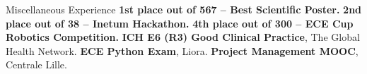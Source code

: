 \begin{rubric}{Miscellaneous Experience}
\entry*[2024] \textbf{1st place out of 567 -- Best Scientific Poster.}
\entry*[2024] \textbf{2nd place out of 38 -- Inetum Hackathon.}
\entry*[2022] \textbf{4th place out of 300 -- ECE Cup Robotics Competition.}
\entry*[2026] \textbf{ICH E6 (R3) Good Clinical Practice}, The Global Health Network.
\entry*[2023] \textbf{ECE Python Exam}, Liora.
\entry*[2023] \textbf{Project Management MOOC}, Centrale Lille.
\end{rubric}